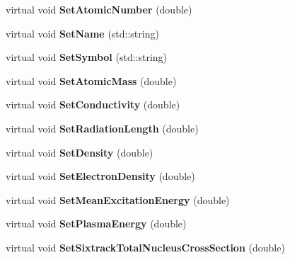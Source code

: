 \begin{DoxyCompactItemize}
\item 
\mbox{\label{classMaterial_ae1c76861394c67fef0fe8140eed29d33}} 
virtual void {\bfseries Set\+Atomic\+Number} (double)
\item 
\mbox{\label{classMaterial_af613682bc7b2b3cf805616015af24ddc}} 
virtual void {\bfseries Set\+Name} (std\+::string)
\item 
\mbox{\label{classMaterial_adcad443a3ee311effac6d13038bf2d8e}} 
virtual void {\bfseries Set\+Symbol} (std\+::string)
\item 
\mbox{\label{classMaterial_a2ac44b05f4430cdc014e705662a3d703}} 
virtual void {\bfseries Set\+Atomic\+Mass} (double)
\item 
\mbox{\label{classMaterial_a9df5f5bf64f69711a084b2833e1e45ee}} 
virtual void {\bfseries Set\+Conductivity} (double)
\item 
\mbox{\label{classMaterial_a05c932efa014014aa29b49b4cda02e42}} 
virtual void {\bfseries Set\+Radiation\+Length} (double)
\item 
\mbox{\label{classMaterial_a26a4541347d037bda629699efa9152b8}} 
virtual void {\bfseries Set\+Density} (double)
\item 
\mbox{\label{classMaterial_a03364fec290102e8cb2f16d23966d8e6}} 
virtual void {\bfseries Set\+Electron\+Density} (double)
\item 
\mbox{\label{classMaterial_ad23b41ce9c281c71c23693198e6eae22}} 
virtual void {\bfseries Set\+Mean\+Excitation\+Energy} (double)
\item 
\mbox{\label{classMaterial_a654554829a40e3796813db3e1c682bea}} 
virtual void {\bfseries Set\+Plasma\+Energy} (double)
\item 
\mbox{\label{classMaterial_ab82d25df46dde9bc047a4cc6fe403419}} 
virtual void {\bfseries Set\+Sixtrack\+Total\+Nucleus\+Cross\+Section} (double)
\item 
\mbox{\label{classMaterial_ab4a6c2d8e3ae42894d2b7df580de83b4}} 

\end{DoxyCompactItemize}

